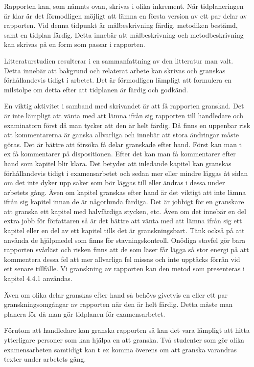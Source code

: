 Rapporten kan, som nämnts ovan, skrivas i olika inkrement. När
tidplaneringen är klar är det förmodligen möjligt att lämna en första
version av ett par delar av rapporten. Vid denna tidpunkt är
målbeskrivning färdig, metodiken bestämd, samt en tidplan färdig. Detta
innebär att målbeskrivning och metodbeskrivning kan skrivas på en form
som passar i rapporten.

Litteraturstudien resulterar i en sammanfattning av den litteratur man
valt. Detta innebär att bakgrund och relaterat arbete kan skrivas och
granskas förhållandevis tidigt i arbetet. Det är förmodligen lämpligt
att formulera en milstolpe om detta efter att tidplanen är färdig och
godkänd.

En viktig aktivitet i samband med skrivandet är att få rapporten
granskad. Det är inte lämpligt att vänta med att lämna ifrån sig
rapporten till handledare och examinatorn först då man tycker att den är
helt färdig. Då finns en uppenbar risk att kommentarerna är ganska
allvarliga och innebär att stora ändringar måste göras. Det är bättre
att försöka få delar granskade efter hand. Först kan man t ex få
kommentarer på dispositionen. Efter det kan man få kommentarer efter
hand som kapitel blir klara. Det betyder att inledande kapitel kan
granskas förhållandevis tidigt i examensarbetet och sedan mer eller
mindre läggas åt sidan om det inte dyker upp saker som bör läggas till
eller ändras i dessa under arbetets gång. Även om kapitel granskas efter
hand är det viktigt att inte lämna ifrån sig kapitel innan de är
någorlunda färdiga. Det är jobbigt för en granskare att granska ett
kapitel med halvfärdiga stycken, etc. Även om det innebär en del extra
jobb för författaren så är det bättre att vänta med att lämna ifrån sig
ett kapitel eller en del av ett kapitel tills det är granskningsbart.
Tänk också på att använda de hjälpmedel som finns för stavningskontroll.
Onödiga stavfel gör bara rapporten svårläst och risken finns att de som
läser får lägga så stor energi på att kommentera dessa fel att mer
allvarliga fel missas och inte upptäcks förrän vid ett senare tillfälle.
Vi granskning av rapporten kan den metod som presenteras i kapitel 4.4.1
användas.

Även om olika delar granskas efter hand så behövs givetvis en eller ett
par granskningsomgångar av rapporten när den är helt färdig. Detta måste
man planera för då man gör tidplanen för examensarbetet.

Förutom att handledare kan granska rapporten så kan det vara lämpligt
att hitta ytterligare personer som kan hjälpa en att granska. Två
studenter som gör olika examensarbeten samtidigt kan t ex komma överens
om att granska varandras texter under arbetets gång.

